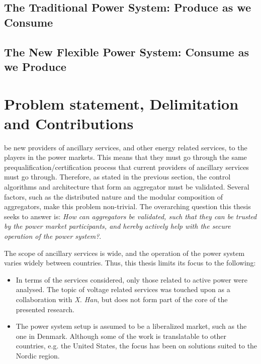 \subsection*{The Traditional Power System: Produce as we Consume}
\label{sub:traditional}

\subsection*{The New Flexible Power System: Consume as we Produce}
\label{sub:future}


\section{Problem statement, Delimitation and Contributions} %
\label{sec:funneling}
 be new providers of ancillary services, and other energy related services, to the players in the power markets. This means that they must go through the same prequalification/certification process that current providers of ancillary services must go through. Therefore, as stated in the previous section, the control algorithms and architecture that form an aggregator must be validated. Several factors, such as the distributed nature and the modular composition of aggregators, make this problem non-trivial. The overarching question this thesis seeks to answer is: \emph{How can aggregators be validated, such that they can be trusted by the power market participants, and hereby actively help with the secure operation of the power system?}.

The scope of ancillary services is wide, and the operation of the power system varies widely between countries. Thus, this thesis limits its focus to the following:
\begin{itemize}
	\item In terms of the services considered, only those related to active power were analysed. The topic of voltage related services was touched upon as a collaboration with \emph{X. Han}, but does not form part of the core of the presented research.
	\item The power system setup is assumed to be a liberalized market, such as the one in Denmark. Although some of the work is translatable to other countries, e.g. the United States, the focus has been on solutions suited to the Nordic region.
\end{itemize}

